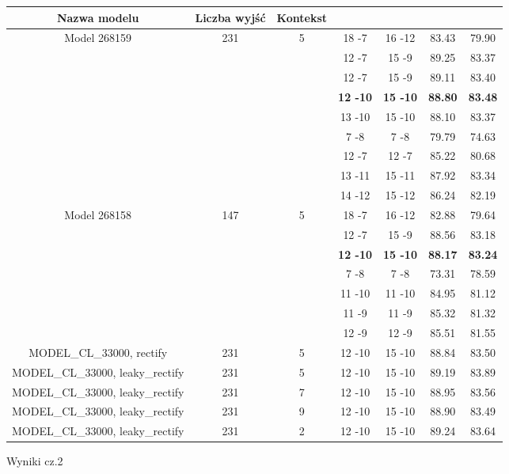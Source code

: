\documentclass[11pt]{article}
\begin{document}
	\begin{figure}
	\begin{adjustwidth}{-3.8cm}{}
	\begin{tabular}{|c|c|c|c|c|c|c|} \hline
		Nazwa modelu & Liczba wyjść & Kontekst & \vtop{\hbox{\strut Parametry}\hbox{\strut pierwszego}\hbox{\strut przejścia}}  & 
		\vtop{\hbox{\strut Parametry}\hbox{\strut drugiego}\hbox{\strut przejścia}} & \vtop{\hbox{\strut Skuteczność}\hbox{\strut corr}} & \vtop{\hbox{\strut Skuteczność}\hbox{\strut acc}} \\
		\hline
		\multirow{9}{*}{Model 268159} &
		\multirow{7}{*}{231}            &
		\multirow{9}{*}{5}          & 18 -7 & 16 -12 & 83.43 & 79.90 \\
		&&& 12 -7 & 15 -9  & 89.25 & 83.37 \\
		&&& 12 -7 & 15 -9  & 89.11 & 83.40 \\
		&&& \textbf{12 -10}& \textbf{15 -10} & \textbf{88.80} & \textbf{83.48} \\
		&&& 13 -10& 15 -10 & 88.10 & 83.37 \\
		&&& 7 -8  & 7 -8   & 79.79 & 74.63 \\
		&&& 12 -7 & 12 -7  & 85.22 & 80.68 \\
		&&& 13 -11& 15 -11 & 87.92 & 83.34 \\
		&&& 14 -12& 15 -12 & 86.24 & 82.19 \\
		\hline
		\multirow{7}{*}{Model 268158} &
		\multirow{7}{*}{147}            &
		\multirow{7}{*}{5}          & 18 -7 & 16 -12 & 82.88 & 79.64 \\
		&&& 12 -7 & 15 -9  & 88.56 & 83.18 \\
		&&& \textbf{12 -10}& \textbf{15 -10} & \textbf{88.17} & \textbf{83.24} \\
		&&& 7 -8  & 7 -8   & 73.31 & 78.59 \\
		&&& 11 -10& 11 -10 & 84.95 & 81.12 \\
		&&& 11 -9 & 11 -9  & 85.32 & 81.32 \\
		&&& 12 -9 & 12 -9  & 85.51 & 81.55 \\
		\hline
		MODEL\_CL\_33000, rectify        & 231 & 5 & 12 -10 & 15 -10 & 88.84 & 83.50 \\
		\hline
		MODEL\_CL\_33000, leaky\_rectify & 231 & 5 & 12 -10 & 15 -10 & 89.19 & 83.89 \\
		\hline
		MODEL\_CL\_33000, leaky\_rectify & 231 & 7 & 12 -10 & 15 -10 & 88.95 & 83.56 \\
		\hline
		MODEL\_CL\_33000, leaky\_rectify & 231 & 9 & 12 -10 & 15 -10 & 88.90 & 83.49 \\
		\hline
		MODEL\_CL\_33000, leaky\_rectify & 231 & 2 & 12 -10 & 15 -10 & 89.24 & 83.64 \\
		\hline
		
	\end{tabular}
	\end{adjustwidth}
	\caption{\label{tab:text2}Wyniki cz.2}
	\end{figure}
\end{document}
